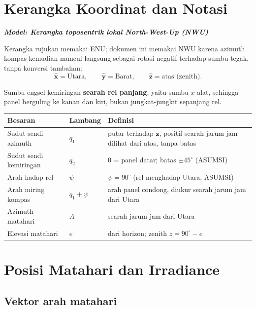 \documentclass[11pt,a4paper]{article}
\newcommand{\degg}{^\circ}
\newcommand{\model}[1]{\textbf{\textit{Model: #1}}}
\begin{document}
\tableofcontents
\newpage

\section{Kerangka Koordinat dan Notasi}

\model{Kerangka toposentrik lokal North-West-Up (NWU)}

Kerangka rujukan memakai ENU; dokumen ini memakai NWU karena azimuth kompas kemudian muncul langsung
sebagai rotasi negatif terhadap sumbu tegak, tanpa konversi tambahan:
\begin{equation}
\hat{\bm{x}} = \text{Utara}, \qquad \hat{\bm{y}} = \text{Barat}, \qquad \hat{\bm{z}} = \text{atas (zenith)}.
\end{equation}

Sumbu engsel kemiringan \textbf{searah rel panjang}, yaitu sumbu $x$ alat, sehingga panel berguling ke kanan
dan kiri, bukan jungkat-jungkit sepanjang rel.

\begin{longtable}{p{3.6cm} p{1.6cm} p{9.6cm}}
\toprule
\textbf{Besaran} & \textbf{Lambang} & \textbf{Definisi} \\
\midrule
\endhead
Sudut sendi azimuth & $q_1$ & putar terhadap $\hat{\bm{z}}$, positif searah jarum jam dilihat dari atas, tanpa batas \\
Sudut sendi kemiringan & $q_2$ & $0$ = panel datar; batas $\pm 45\degg$ (ASUMSI) \\
Arah hadap rel & $\psi$ & $\psi = 90\degg$ (rel menghadap Utara, ASUMSI) \\
Arah miring kompas & $q_1 + \psi$ & arah panel condong, diukur searah jarum jam dari Utara \\
Azimuth matahari & $A$ & searah jarum jam dari Utara \\
Elevasi matahari & $e$ & dari horizon; zenith $z = 90\degg - e$ \\
\bottomrule
\end{longtable}

\section{Posisi Matahari dan Irradiance}

\subsection{Vektor arah matahari}
\end{document}
